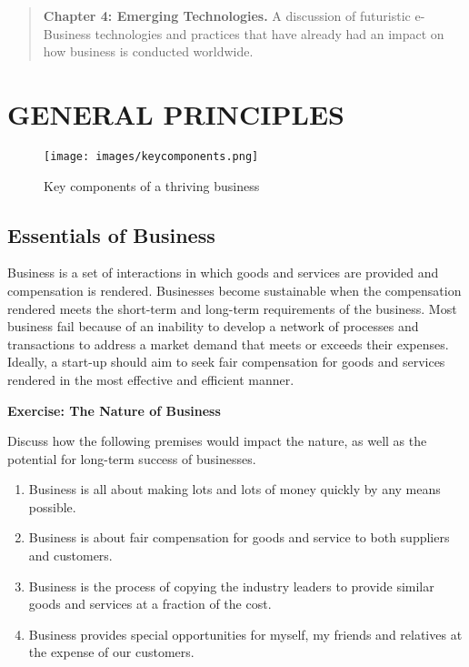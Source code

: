 \documentclass[]{book}
\providecommand{\tightlist}{%
  \setlength{\itemsep}{0pt}\setlength{\parskip}{0pt}}
\let\BeginKnitrBlock\begin \let\EndKnitrBlock\end
\begin{document}
\begin{quote}
\textbf{Chapter 4: Emerging Technologies.} A discussion of futuristic e-Business technologies and practices that have already had an impact on how business is conducted worldwide.
\end{quote}

\hypertarget{general-principles}{%
\chapter{GENERAL PRINCIPLES}\label{general-principles}}

\begin{figure}
\centering
\texttt{[image: images/keycomponents.png]}
\caption{Key components of a thriving business}
\end{figure}

\hypertarget{essentials-of-business}{%
\section{Essentials of Business}\label{essentials-of-business}}

Business is a set of interactions in which goods and services are provided and compensation is rendered. Businesses become sustainable when the compensation rendered meets the short-term and long-term requirements of the business. Most business fail because of an inability to develop a network of processes and transactions to address a market demand that meets or exceeds their expenses. Ideally, a start-up should aim to seek fair compensation for goods and services rendered in the most effective and efficient manner.

\BeginKnitrBlock{rmdexercise}
\textbf{Exercise: The Nature of Business}

Discuss how the following premises would impact the nature, as well as the potential for long-term success of businesses.

\begin{enumerate}
\def\labelenumi{\arabic{enumi}.}
\tightlist
\item
  Business is all about making lots and lots of money quickly by any means possible.
\item
  Business is about fair compensation for goods and service to both suppliers and customers.
\item
  Business is the process of copying the industry leaders to provide similar goods and services at a fraction of the cost.
\item
  Business provides special opportunities for myself, my friends and relatives at the expense of our customers.
\end{enumerate}
\EndKnitrBlock{rmdexercise}
\end{document}
